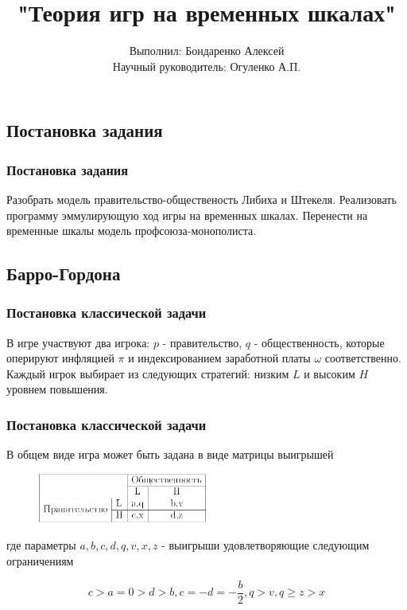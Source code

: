 \documentclass {beamer}
\title{ "Теория игр на временных шкалах"}
\author {Выполнил: Бондаренко Алексей \\Научный руководитель: Огуленко А.П.}
\date{}
\begin{document}
\begin{frame}
\maketitle
\end{frame}

\begin{frame}
\section{Постановка задания}
\frametitle{Постановка задания}
Разобрать модель правительство-общественость Либиха и Штекеля. Реализовать программу эммулирующую ход игры на временных шкалах. 
Перенести на временные шкалы модель профсоюза-монополиста. 
\end{frame}

\begin{frame}
	\section{Барро-Гордона}
\frametitle{Постановка классической задачи}
В игре участвуют два игрока: $p$ - правительство, $q$ - общественность, которые оперируют инфляцией $\pi$  и индексированием заработной платы $\omega$ соответственно. Каждый игрок выбирает из следующих стратегий: низким $L$  и высоким  $H$ уровнем повышения.
\end{frame}

\begin{frame}
\frametitle{Постановка классической задачи}
В общем виде игра может быть задана в виде матрицы выигрышей
\begin{figure}[h!]
	\centering
	\includegraphics[width=0.5\textwidth]{first}
\end{figure}

  где параметры $a,b,c,d,q,v,x,z$  - выигрыши удовлетворяющие следующим ограничениям

\begin{equation}
\label{eq:sec:ot:constraint}
c>a=0 > d > b,c=-d=-\frac{b}{2}, q>v,q\ge z>x
\end{equation}
\end{frame}

%
\end{document}
